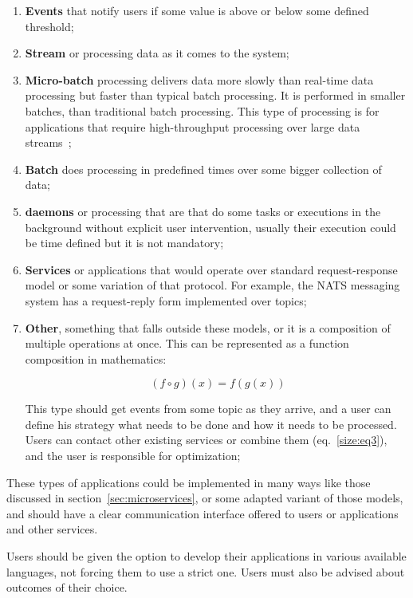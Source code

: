 \begin{enumerate}[start=1,label={(\bfseries \arabic*)}]
	\item \textbf{Events} that notify users if some value is above or below some defined threshold; 
	\item \textbf{Stream} or processing data as it comes to the system;
	\item \textbf{Micro-batch} processing delivers data more slowly than real-time data processing but faster than typical batch processing. It is performed in smaller batches, than traditional batch processing. This type of processing is for applications that require high-throughput processing over large data streams~\cite{AbdelhamidMDA20};
	\item \textbf{Batch} does processing in predefined times over some bigger collection of data;
	\item \textbf{daemons} or processing that are that do some tasks or executions in the background without explicit user intervention, usually their execution could be time defined but it is not mandatory;
	\item \textbf{Services} or applications that would operate over standard request-response model or some variation of that protocol. For example, the NATS messaging system has a request-reply form implemented over topics;
	\item \textbf{Other}, something that falls outside these models, or it is a composition of multiple operations at once. This can be represented as a function composition in mathematics:
	
	\begin{equation}~\label{size:eq3}
		(f \circ g)(x) = f(g(x))
	\end{equation}
	
	This type should get events from some topic as they arrive, and a user can define his strategy what needs to be done and how it needs to be processed. Users can contact other existing services or combine them (eq.~\ref{size:eq3}), and the user is responsible for optimization;
\end{enumerate}

\noindent
These types of applications could be implemented in many ways like those discussed in section~\ref{sec:microservices}, or some adapted variant of those models, and should have a clear communication interface offered to users or applications and other services. 

Users should be given the option to develop their applications in various available languages, not forcing them to use a strict one. Users must also be advised about outcomes of their choice. 

